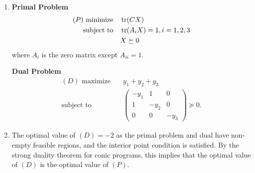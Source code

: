 \begin{enumerate}
\begin{enumerate}[label=(\arabic*)]
                    On the other hand, let \(X = \begin{pmatrix}
                        1  & -1 & 0 \\
                        -1 & 1  & 0 \\
                        0  & 0  & 1
                    \end{pmatrix}\), then \(X\) is feasible and \(\tr(CX) = -2\). So optimal value \(\leq -2\), thus optimal value must be \(= 2\).
              \item \begin{minipage}[t]{0.45\textwidth}
                        \textbf{Primal Problem}
                        \begin{align*}
                            (P) \text{ minimize} \quad & \tr(CX)                     \\
                            \text{subject to} \quad    & \tr(A_i X) = 1, i = 1, 2, 3 \\
                                                       & X \succeq 0
                        \end{align*}
                        where \(A_i\) is the zero matrix except \(A_{ii} = 1\).
                    \end{minipage}
                    \hfill
                    \begin{minipage}[t]{0.45\textwidth}
                        \textbf{Dual Problem}
                        \begin{align*}
                            (D) \text{ maximize} \quad & y_1 + y_2 + y_3                       \\
                            \text{subject to} \quad    & \begin{pmatrix}
                                -y_1 & 1    & 0    \\
                                1    & -y_2 & 0    \\
                                0    & 0    & -y_3
                            \end{pmatrix} \succeq 0.
                        \end{align*}
                    \end{minipage}
              \item The optimal value of \((D) = -2\) as the primal problem and dual have non-empty feasible regions, and the interior point condition is satisfied. By the strong duality theorem for conic programs, this implies that the optimal value of \((D)\) is the optimal value of \((P)\).

\end{enumerate}
\end{enumerate}

